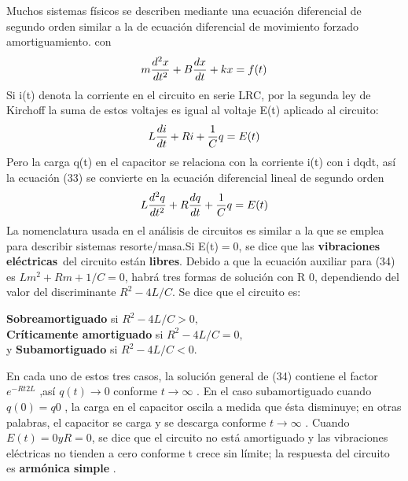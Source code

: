 \documentclass[12pt,a4paper]{article}
\begin{document}
Muchos sistemas físicos se describen mediante una ecuación diferencial de segundo orden similar a la de ecuación diferencial de movimiento forzado amortiguamiento. con\vspace{5mm}\\
\begin{equation}
m\frac{d^2x}{dt^2} + B\frac{dx}{dt}+kx = f(t) \vspace{5mm}\\
\end{equation}
Si i(t) denota la corriente en el circuito en serie LRC, por la segunda ley de Kirchoff la suma de estos voltajes es igual al voltaje E(t) aplicado al circuito:
\begin{equation}
L\frac{di}{dt} +Ri+ \frac{1}{C}q = E(t) \vspace{5mm}\\
\end{equation}
Pero la carga q(t) en el capacitor se relaciona con la corriente i(t) con i  dqdt, así la
ecuación (33) se convierte en la ecuación diferencial lineal de segundo orden
\begin{equation}
L\frac{d^2q}{dt^2} +R\frac{dq}{dt} + \frac{1}{C}q = E(t) \\
\end{equation}
La nomenclatura usada en el análisis de circuitos es similar a la que se emplea
para describir sistemas resorte/masa.Si E(t)$= 0$, se dice que las \textbf{vibraciones eléctricas}\ del circuito están 
\textbf{libres}. Debido a que la ecuación auxiliar para (34) es $Lm^2 + Rm + 1/C= 0$, habrá tres formas de solución con R  0, dependiendo del valor del discriminante $R^2- 4L/C$. Se dice que el circuito es:\vspace{5mm}\\
\begin{center}
\textbf{Sobreamortiguado}   si  \hspace{2cm}$ R^2 -4L/C> 0,$\vspace{5mm}\\
\textbf{Críticamente amortiguado}  si\hspace{1cm} $  R^2- 4L/C =0,$\vspace{5mm}\\
y \textbf{Subamortiguado}     si \hspace{2.3cm} $R^2 - 4L/C <0.$\vspace{5mm}\\
\end{center}
En cada uno de estos tres casos, la solución general de (34) contiene el factor $e^{-Rt2L}$
,así $q(t)\rightarrow 0 $  conforme  $ t
\rightarrow \infty$ . En el caso subamortiguado cuando $q(0)= q0$
, la carga en el capacitor oscila a medida que ésta disminuye; en otras palabras, el capacitor se
carga y se descarga conforme  $ t
\rightarrow \infty$ . Cuando $E(t) = 0  y  R = 0$, se dice que el circuito
no está amortiguado y las vibraciones eléctricas no tienden a cero conforme t crece sin
límite; la respuesta del circuito es \textbf{armónica simple} .
\end{document}

